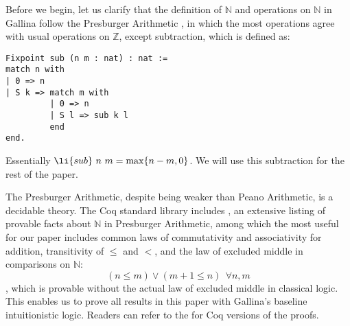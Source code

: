 Before we begin, let us clarify that the definition of $\mathbb{N}$ and operations on $\mathbb{N}$ in Gallina follow the Presburger Arithmetic \cite{presburger}, in which the most operations agree with usual operations on $\mathbb{Z}$, except subtraction, which is defined as:
\begin{lstlisting}
Fixpoint sub (n m : nat) : nat :=
match n with
| 0 => n
| S k => match m with
         | 0 => n
         | S l => sub k l
         end
end.
\end{lstlisting}
Essentially $\li{sub} \ n \ m = \max\{n - m, 0\}$. We will use this subtraction for the rest of the paper.

The Presburger Arithmetic, despite being weaker than Peano Arithmetic, is a decidable theory. The Coq standard library includes , an extensive listing of provable facts about $\mathbb{N}$ in Presburger Arithmetic, among which the most useful for our paper includes common laws of commutativity and associativity for addition, transitivity of $\le$ and $<$, and the law of excluded middle in comparisons on $\mathbb{N}$:
\begin{equation}
(n \le m) \vee (m + 1 \le n) \ \ \forall n, m
\end{equation}
, which is provable without the actual law of excluded middle in classical logic. This enables us to prove all results in this paper with Gallina's baseline intuitionistic logic. Readers can refer to the  for Coq versions of the proofs.

